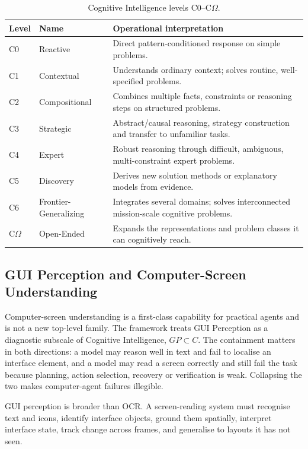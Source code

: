 \documentclass[11pt]{article}
\theoremstyle{definition}
\newcommand{\Om}{\ensuremath{\Omega}}
\begin{document}
\begin{table}[H]
\centering\small
\begin{tabularx}{\textwidth}{@{}llY@{}}
\toprule
Level & Name & Operational interpretation \\
\midrule
C0 & Reactive & Direct pattern-conditioned response on simple problems. \\
C1 & Contextual & Understands ordinary context; solves routine, well-specified problems. \\
C2 & Compositional & Combines multiple facts, constraints or reasoning steps on structured problems. \\
C3 & Strategic & Abstract/causal reasoning, strategy construction and transfer to unfamiliar tasks. \\
C4 & Expert & Robust reasoning through difficult, ambiguous, multi-constraint expert problems. \\
C5 & Discovery & Derives new solution methods or explanatory models from evidence. \\
C6 & Frontier-Generalizing & Integrates several domains; solves interconnected mission-scale cognitive problems. \\
C\Om{} & Open-Ended & Expands the representations and problem classes it can cognitively reach. \\
\bottomrule
\end{tabularx}
\caption{Cognitive Intelligence levels C0--C\Om{}.}
\label{tab:clevels}
\end{table}

\subsection{GUI Perception and Computer-Screen Understanding}\label{sec:gp}

Computer-screen understanding is a first-class capability for practical agents and is not a new top-level family. The framework treats GUI Perception as a diagnostic subscale of Cognitive Intelligence, $GP \subset C$. The containment matters in both directions: a model may reason well in text and fail to localise an interface element, and a model may read a screen correctly and still fail the task because planning, action selection, recovery or verification is weak. Collapsing the two makes computer-agent failures illegible.

GUI perception is broader than OCR. A screen-reading system must recognise text and icons, identify interface objects, ground them spatially, interpret interface state, track change across frames, and generalise to layouts it has not seen.
\end{document}
